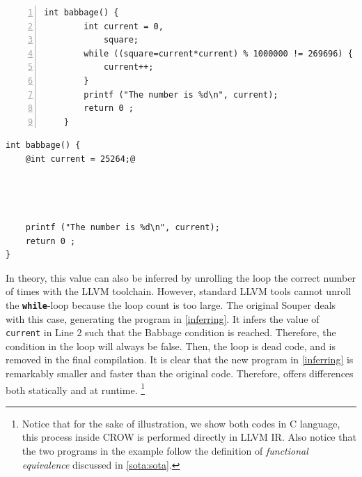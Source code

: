 {


\begin{minipage}[t]{0.5\linewidth}
    \begin{lstlisting}[numbers=left]
    int babbage() {
        int current = 0,
            square;
        while ((square=current*current) % 1000000 != 269696) {
            current++;
        }
        printf ("The number is %d\n", current);
        return 0 ;
    }
    \end{lstlisting}
\end{minipage}
\begin{minipage}[t]{0.5\linewidth}
    \begin{lstlisting}[]
int babbage() {
    @int current = 25264;@
    
    


    printf ("The number is %d\n", current);
    return 0 ;
}
    \end{lstlisting}
\end{minipage}
}
In theory, this value can also be inferred by unrolling the loop the correct number of times with the LLVM toolchain.
However, standard LLVM tools cannot unroll the \texttt{\textbf{while}}-loop because the loop count is too large.
The original Souper deals with this case, generating the program in \autoref{inferring}. It infers the value of \texttt{current} in Line 2 such that the Babbage condition is reached. Therefore, the condition in the loop will always be false. Then, the loop is dead code, and is removed in the final compilation. 
It is clear that the new program in \autoref{inferring} is remarkably smaller and faster than the original code. Therefore, offers differences both statically and at runtime. 
\footnote{ Notice that for the sake of illustration, we show both codes in C language, this process inside CROW is performed directly in LLVM IR. Also notice that the two programs in the example follow the definition of \emph{functional equivalence} discussed in \autoref{sota:sota}.}




